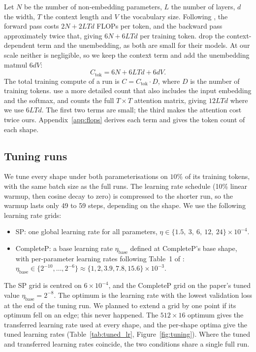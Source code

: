 \documentclass[10pt,twocolumn,a4paper]{article}
\newcommand{\sh}[2]{\ensuremath{#1{\times}#2}}  %
\begin{document}
Let $N$ be the number of non-embedding parameters, $L$ the number of layers, $d$ the width, $T$ the context length and $V$ the vocabulary size. Following \citet[Eq.~2.2]{kaplan2020scaling}, the forward pass costs $2N + 2LTd$ FLOPs per token, and the backward pass approximately twice that, giving $6N + 6LTd$ per training token. \citeauthor{kaplan2020scaling} drop the context-dependent term and the unembedding, as both are small for their models. At our scale neither is negligible, so we keep the context term and add the unembedding matmul $6dV$:
\[
C_{\text{tok}} = 6N + 6LTd + 6dV.
\]
The total training compute of a run is $C = C_{\text{tok}} \cdot D$, where $D$ is the number of training tokens. \citet{hoffmann2022training} use a more detailed count that also includes the input embedding and the softmax, and counts the full $T \times T$ attention matrix, giving $12LTd$ where we use $6LTd$. The first two terms are small; the third makes the attention cost twice ours. Appendix~\ref{app:flops} derives each term and gives the token count of each shape.

\subsection{Tuning runs}

We tune every shape under both parameterisations on $10\%$ of its training tokens, with the same batch size as the full runs. The learning rate schedule (10\% linear warmup, then cosine decay to zero) is compressed to the shorter run, so the warmup lasts only 49 to 59 steps, depending on the shape. We use the following learning rate grids:
\begin{itemize}[leftmargin=*,itemsep=1pt]
    \item SP: one global learning rate for all parameters,
    $\eta \in \{1.5,\ 3,\ 6,\ 12,\ 24\} \times 10^{-4}$.
    \item CompleteP: a base learning rate $\eta_{\text{base}}$ defined at CompleteP's base shape, with per-parameter learning rates following Table~1 of \citet{dey2025completep}: $\eta_{\text{base}} \in \{2^{-10}, \dots, 2^{-6}\} \approx \{1, 2, 3.9, 7.8, 15.6\} \times 10^{-3}$.
\end{itemize}
The SP grid is centred on $6\times10^{-4}$, and the CompleteP grid on the paper's tuned value $\eta_{\text{base}} = 2^{-8}$. The optimum is the learning rate with the lowest validation loss at the end of the tuning run. We planned to extend a grid by one point if its optimum fell on an edge; this never happened. The \sh{512}{16} optimum gives the transferred learning rate used at every shape, and the per-shape optima give the tuned learning rates (Table~\ref{tab:tuned_lr}, Figure~\ref{fig:tuning}). Where the tuned and transferred learning rates coincide, the two conditions share a single full run.
\end{document}

